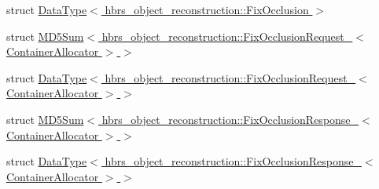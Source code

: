 \begin{DoxyCompactItemize}
\item 
struct \hyperlink{structros_1_1service__traits_1_1_data_type_3_01hbrs__object__reconstruction_1_1_fix_occlusion_01_4}{\-Data\-Type$<$ hbrs\-\_\-object\-\_\-reconstruction\-::\-Fix\-Occlusion $>$}
\item 
struct \hyperlink{structros_1_1service__traits_1_1_m_d5_sum_3_01hbrs__object__reconstruction_1_1_fix_occlusion_req8133090b82d0f7fba2a4e56d69b04acd}{\-M\-D5\-Sum$<$ hbrs\-\_\-object\-\_\-reconstruction\-::\-Fix\-Occlusion\-Request\-\_\-$<$ Container\-Allocator $>$ $>$}
\item 
struct \hyperlink{structros_1_1service__traits_1_1_data_type_3_01hbrs__object__reconstruction_1_1_fix_occlusion_re73b97b28e560381364e170bc00cac90c}{\-Data\-Type$<$ hbrs\-\_\-object\-\_\-reconstruction\-::\-Fix\-Occlusion\-Request\-\_\-$<$ Container\-Allocator $>$ $>$}
\item 
struct \hyperlink{structros_1_1service__traits_1_1_m_d5_sum_3_01hbrs__object__reconstruction_1_1_fix_occlusion_rescad50a55fffa9d2254b798e29fe08d1f}{\-M\-D5\-Sum$<$ hbrs\-\_\-object\-\_\-reconstruction\-::\-Fix\-Occlusion\-Response\-\_\-$<$ Container\-Allocator $>$ $>$}
\item 
struct \hyperlink{structros_1_1service__traits_1_1_data_type_3_01hbrs__object__reconstruction_1_1_fix_occlusion_re0f91c520351337ad88c972b291a5cc3a}{\-Data\-Type$<$ hbrs\-\_\-object\-\_\-reconstruction\-::\-Fix\-Occlusion\-Response\-\_\-$<$ Container\-Allocator $>$ $>$}
\end{DoxyCompactItemize}
